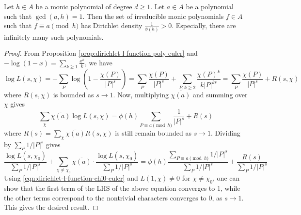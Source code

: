 \begin{theorem}
    \label{thm:dirichlet-poly}
    Let $h \in A$ be a monic polynomial of degree $d \ge 1$.
    Let $a \in A$ be a polynomial such that $\gcd(a, h) = 1$.
    Then the set of irreducible monic polynomials $f \in A$ such that $f \equiv a \pmod{h}$ has Dirichlet density $\frac{1}{\phi(h)} > 0$.
    Especially, there are infinitely many such polynomials.
\end{theorem}
\begin{proof}
    From Proposition \ref{prop:dirichlet-l-function-poly-euler} and $-\log(1 - x) = \sum_{k \ge 1} \frac{x^k}{k}$, we have
    \begin{equation}
        \log L(s, \chi) = - \sum_{P} \log\left(1 - \frac{\chi(P)}{|P|^{s}}\right) = \sum_{P} \frac{\chi(P)}{|P|^s} + \sum_{P, k \ge 2} \frac{\chi(P)^k}{k |P|^{ks}} = \sum_{P} \frac{\chi(P)}{|P|^s} + R(s, \chi)
    \end{equation}
    where $R(s, \chi)$ is bounded as $s \to 1$.
    Now, multiplying $\overline{\chi(a)}$ and summing over $\chi$ gives
    \begin{equation}
        \sum_\chi \overline{\chi(a)} \log L(s, \chi) = \phi(h) \sum_{P \equiv a \pmod{h}} \frac{1}{|P|^s} + R(s)
    \end{equation}
    where $R(s) = \sum_\chi \overline{\chi(a)} R(s, \chi)$ is still remain bounded as $s \to 1$.
    Dividing by $\sum_{P} 1 / |P|^{s}$ gives
    \begin{equation}
        \frac{\log L(s, \chi_0)}{\sum_{P} 1 / |P|^s} + \sum_{\chi \ne \chi_0} \overline{\chi(a)} \cdot \frac{\log L(s, \chi_0)}{\sum_{P} 1 / |P|^s} = \phi(h) \frac{\sum_{P \equiv a \pmod{h}} 1 / |P|^s}{\sum_{P} 1 / |P|^s} + \frac{R(s)}{\sum_{P} 1 / |P|^s}
    \end{equation}
    Using \eqref{eqn:dirichlet-l-function-chi0-euler} and $L(1, \chi) \ne 0$ for $\chi \ne \chi_0$, one can show that the first term of the LHS of the above equation converges to 1, while the other terms correspond to the nontrivial characters converges to 0, as $s \to 1$.
    This gives the desired result.
\end{proof}

